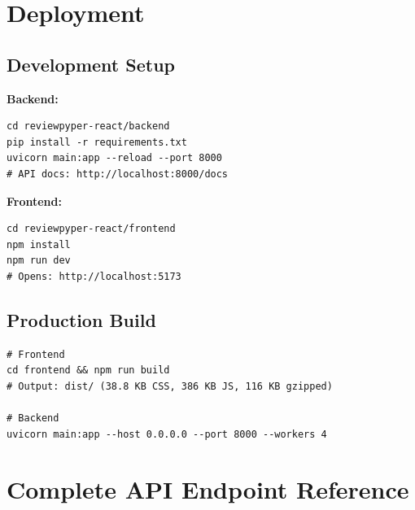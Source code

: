 \documentclass[11pt,a4paper]{article}
\begin{document}
\section{Deployment}

\subsection{Development Setup}

\textbf{Backend:}
\begin{lstlisting}[style=python, title=Backend Setup]
cd reviewpyper-react/backend
pip install -r requirements.txt
uvicorn main:app --reload --port 8000
# API docs: http://localhost:8000/docs
\end{lstlisting}

\textbf{Frontend:}
\begin{lstlisting}[style=python, title=Frontend Setup]
cd reviewpyper-react/frontend
npm install
npm run dev
# Opens: http://localhost:5173
\end{lstlisting}

\subsection{Production Build}

\begin{lstlisting}[style=python, title=Production Build]
# Frontend
cd frontend && npm run build
# Output: dist/ (38.8 KB CSS, 386 KB JS, 116 KB gzipped)

# Backend
uvicorn main:app --host 0.0.0.0 --port 8000 --workers 4
\end{lstlisting}

\section{Complete API Endpoint Reference}
\end{document}
